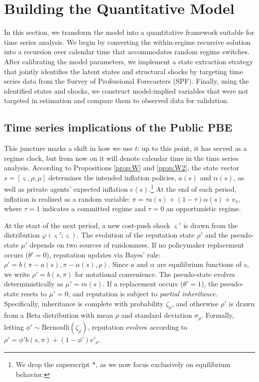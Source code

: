 \documentclass[12pt,letter,leqno]{article}
\theoremstyle{asn}
\theoremstyle{lem}
\theoremstyle{slem}
\theoremstyle{prop}
\theoremstyle{appprop}
\theoremstyle{rem}
\theoremstyle{defn}
\begin{document}
\section{Building the Quantitative Model}
\label{sec:buildingmodel}

In this section, we transform the model into a quantitative framework suitable for time series analysis. We begin by converting the within-regime recursive solution into a recursion over calendar time that accommodates random regime switches. After calibrating the model parameters, we implement a state extraction strategy that jointly identifies the latent states and structural shocks by targeting time series data from the Survey of Professional Forecasters (SPF). Finally, using the identified states and shocks, we construct model-implied variables that were not targeted in estimation and compare them to observed data for validation.

\subsection{Time series implications of the Public PBE}\label{sec:tsrecursion}
This juncture marks a shift in how we use $t$: up to this point, it has served as a regime clock, but from now on it will denote calendar time in the time series analysis. According to Propositions \ref{prop:W} and \ref{prop:W2}, the state vector $s = [\varsigma, \rho, \mu]$ determines the intended inflation policies, $a(s)$ and $\alpha(s)$, as well as private agents’ expected inflation $e(s)$.\footnote{We drop the superscript $*$, as we now focus exclusively on equilibrium behavior.} At the end of each period, inflation is realized as a random variable: $\pi = \tau a(s) + (1 - \tau) \alpha(s) + v_{\pi}$, where $\tau = 1$ indicates a committed regime and $\tau = 0$ an opportunistic regime.

At the start of the next period, a new cost-push shock $\varsigma'$ is drawn from the distribution $\varphi(\varsigma'; \varsigma)$. The evolution of the reputation state $\rho'$ and the pseudo-state $\mu'$ depends on two sources of randomness. If no policymaker replacement occurs ($\theta' = 0$), reputation updates via Bayes’ rule: $\rho' = b(\pi-a(s), \pi-\alpha(s), \rho)$. Since $a$ and $\alpha$ are equilibrium functions of $s$, we write $\rho' = b(s, \pi)$ for notational convenience. The pseudo-state evolves deterministically as $\mu' = m(s)$. If a replacement occurs ($\theta' = 1$), the pseudo-state resets to $\mu' = 0$, and reputation is subject to \textit{partial inheritance}. Specifically, inheritance is complete with probability $\zeta_\rho$, and otherwise $\rho'$ is drawn from a Beta distribution with mean $\overline{\rho}$ and standard deviation $\sigma_\rho$. Formally, letting $\phi' \sim \text{Bernoulli}(\zeta_\rho)$, reputation evolves according to $\rho' = \phi' b(s, \pi) + (1 - \phi') v'_\rho$.
\end{document}
